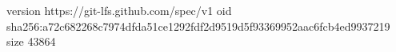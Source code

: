 version https://git-lfs.github.com/spec/v1
oid sha256:a72c682268c7974dfda51ce1292fdf2d9519d5f93369952aac6fcb4ed9937219
size 43864
